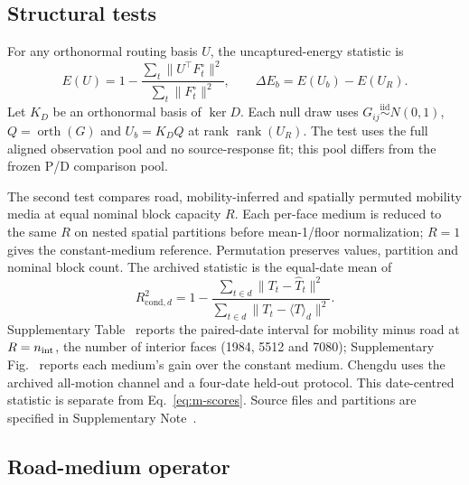 \documentclass[11pt]{article}
\begin{document}
\subsection{Structural tests}

For any orthonormal routing basis $U$, the uncaptured-energy statistic is
\begin{equation}\label{eq:m-null}
 E(U)=1-\frac{\sum_t\|U^\top F_t^\circ\|^2}{\sum_t\|F_t^\circ\|^2},
 \qquad \Delta E_b=E(U_b)-E(U_R).
\end{equation}
Let $K_D$ be an orthonormal basis of $\ker D$. Each null draw uses $G_{ij}\overset{\mathrm{iid}}{\sim}N(0,1)$, $Q=\operatorname{orth}(G)$ and $U_b=K_DQ$ at rank $\operatorname{rank}(U_R)$. The test uses the full aligned observation pool and no source-response fit; this pool differs from the frozen P/D comparison pool.

The second test compares road, mobility-inferred and spatially permuted mobility media at equal nominal block capacity $R$. Each per-face medium is reduced to the same $R$ on nested spatial partitions before mean-1/floor normalization; $R=1$ gives the constant-medium reference. Permutation preserves values, partition and nominal block count. The archived statistic is the equal-date mean of
\begin{equation}\label{eq:m-conditional}
 R_{\mathrm{cond},d}^2=1-
 \frac{\sum_{t\in d}\|T_t-\widehat T_t\|^2}
 {\sum_{t\in d}\|T_t-\langle T\rangle_d\|^2}.
\end{equation}
Supplementary Table~ reports the paired-date interval for mobility minus road at $R=n_{\rm int}$, the number of interior faces (1984, 5512 and 7080); Supplementary Fig.~ reports each medium's gain over the constant medium. Chengdu uses the archived all-motion channel and a four-date held-out protocol. This date-centred statistic is separate from Eq.~\ref{eq:m-scores}. Source files and partitions are specified in Supplementary Note~.

\subsection{Road-medium operator}\label{sec:m-roadop}
\end{document}
